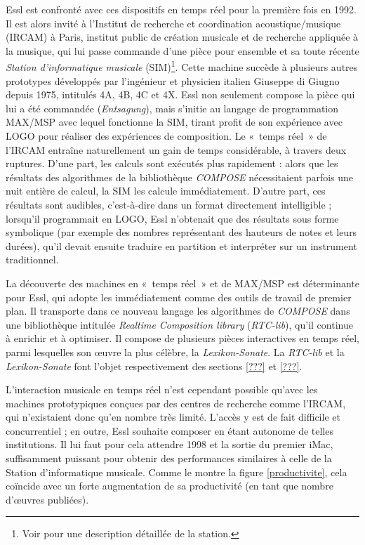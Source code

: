 \documentclass[a4paper,12pt]{article}
\newcommand{\guill}[1]{«~#1~»}
\begin{document}
Essl est confronté avec ces dispositifs en temps réel pour la première fois en 1992. Il est alors invité à l'Institut de recherche et coordination acoustique/musique (IRCAM) à Paris, institut public de création musicale et de recherche appliquée à la musique, qui lui passe commande d'une pièce pour ensemble et sa toute récente \emph{Station d'informatique musicale} (SIM)\footnote{Voir \cite{lippe1991ircam} pour une description détaillée de la station.}. Cette machine succède à plusieurs autres prototypes développés par l'ingénieur et physicien italien Giuseppe di Giugno depuis 1975, intitulés 4A, 4B, 4C et 4X. Essl non seulement compose la pièce qui lui a été commandée (\emph{Entsagung}), mais s'initie au langage de programmation MAX/MSP avec lequel fonctionne la SIM, tirant profit de son expérience avec LOGO pour réaliser des expériences de composition. Le \guill{temps réel} de l'IRCAM entraîne naturellement un gain de temps considérable, à travers deux ruptures. D'une part, les calculs sont exécutés plus rapidement : alors que les résultats des algorithmes de la bibliothèque \emph{COMPOSE} nécessitaient parfois une nuit entière de calcul, la SIM les calcule immédiatement. D'autre part, ces résultats sont audibles, c'est-à-dire dans un format directement intelligible ; lorsqu'il programmait en LOGO, Essl n'obtenait que des résultats sous forme symbolique (par exemple des nombres représentant des hauteurs de notes et leurs durées), qu'il devait ensuite traduire en partition et interpréter sur un instrument traditionnel.

La découverte des machines en \guill{temps réel} et de MAX/MSP est déterminante pour Essl, qui adopte les immédiatement comme des outils de travail de premier plan. Il transporte dans ce nouveau langage les algorithmes de \emph{COMPOSE} dans une bibliothèque intitulée \emph{Realtime Composition library} (\emph{RTC-lib}), qu'il continue à enrichir et à optimiser. Il compose de plusieurs pièces interactives en temps réel, parmi lesquelles son œuvre la plus célèbre, la \emph{Lexikon-Sonate}. La \emph{RTC-lib} et la \emph{Lexikon-Sonate} font l'objet respectivement des sections \ref{???} et \ref{???}.

L'interaction musicale en temps réel n'est cependant possible qu'avec les machines prototypiques conçues par des centres de recherche comme l'IRCAM, qui n'existaient donc qu'en nombre très limité. L'accès y est de fait difficile et concurrentiel ; en outre, Essl souhaite composer en étant autonome de telles institutions. Il lui faut pour cela attendre 1998 et la sortie du premier iMac, suffisamment puissant pour obtenir des performances similaires à celle de la Station d'informatique musicale. Comme le montre la figure \ref{productivite}, cela coïncide avec un forte augmentation de sa productivité (en tant que nombre d'œuvres publiées).
\end{document}
